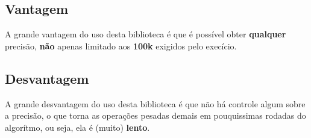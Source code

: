 \documentclass[paper=a4, fontsize=11pt]{scrartcl}
\numberwithin{equation}{section}		%
\numberwithin{figure}{section}			%
\numberwithin{table}{section}				%
\begin{document}
\subsection{Vantagem}
A grande vantagem do uso desta biblioteca é que é possível obter \textbf{qualquer} precisão, \textbf{não} apenas limitado aos \textbf{100k} exigidos pelo execício.\\

\subsection{Desvantagem}
A grande desvantagem do uso desta biblioteca é que não há controle algum sobre a precisão, o que torna as operações pesadas  demais em pouquissimas rodadas do algorítmo, ou seja, ela é (muito) \textbf{lento}.\\


\end{document}
